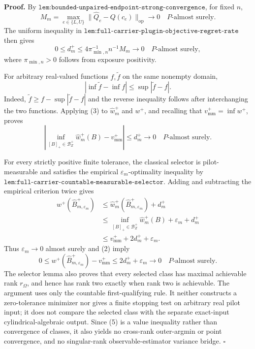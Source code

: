 \textbf{Proof.}
By \(\texttt{lem:bounded-unpaired-endpoint-strong-convergence}\), for fixed \(n\),
\[
M_m=\max_{e\in\{L,U\}}
\lVert\widehat Q_e-Q(c_e)\rVert_{\mathrm{op}}
\longrightarrow0
\quad P\text{-almost surely}.
\tag{1}
\]
The uniform inequality in \(\texttt{lem:full-carrier-plugin-objective-regret-rate}\) then gives
\[
0\le d_m^+
\le4\pi_{\min,n}^{-1}n^{-1}M_m
\longrightarrow0
\quad P\text{-almost surely},
\tag{2}
\]
where \(\pi_{\min,n}>0\) follows from exposure positivity.

For arbitrary real-valued functions \(f,\widetilde f\) on the same nonempty domain,
\[
\left|\inf\widetilde f-\inf f\right|
\le\sup|\widetilde f-f|.
\tag{3}
\]
Indeed, \(\widetilde f\ge f-\sup|\widetilde f-f|\) and the reverse inequality follows after interchanging the two functions.  Applying (3) to \(\widehat w_m^+\) and \(w^+\), and recalling that \(v_{\mathrm{mm}}^+=\inf w^+\), proves
\[
\left|\inf_{[B]_+\in\mathcal B_Z^+}\widehat w_m^+(B)
-v_{\mathrm{mm}}^+\right|
\le d_m^+\longrightarrow0
\quad P\text{-almost surely}.
\tag{4}
\]

For every strictly positive finite tolerance, the classical selector is pilot-measurable and satisfies the empirical \(\varepsilon_m\)-optimality inequality by \(\texttt{lem:full-carrier-countable-measurable-selector}\).  Adding and subtracting the empirical criterion twice gives
\[
\begin{aligned}
w^+(\widehat B_{m,\varepsilon_m}^+)
&\le\widehat w_m^+(\widehat B_{m,\varepsilon_m}^+)+d_m^+\\
&\le\inf_{[B]_+\in\mathcal B_Z^+}\widehat w_m^+(B)
+\varepsilon_m+d_m^+\\
&\le v_{\mathrm{mm}}^++2d_m^++\varepsilon_m.
\end{aligned}
\tag{5}
\]
Thus \(\varepsilon_m\to0\) almost surely and (2) imply
\[
0\le w^+(\widehat B_{m,\varepsilon_m}^+)-v_{\mathrm{mm}}^+
\le2d_m^++\varepsilon_m\longrightarrow0
\quad P\text{-almost surely}.
\tag{6}
\]
The selector lemma also proves that every selected class has maximal achievable rank \(r_\Omega\), and hence has rank two exactly when rank two is achievable.  The argument uses only the countable first-qualifying rule.  It neither constructs a zero-tolerance minimizer nor gives a finite stopping test on arbitrary real pilot input; it does not compare the selected class with the separate exact-input cylindrical-algebraic output.  Since (5) is a value inequality rather than convergence of classes, it also yields no cross-rank outer-argmin or point convergence, and no singular-rank observable-estimator variance bridge. \(\square\)